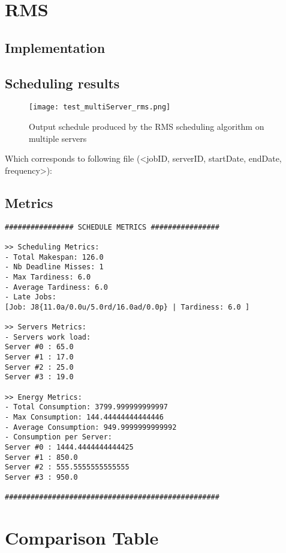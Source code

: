 \documentclass[./report.tex]{subfiles}
\begin{document}
\newpage
\section{RMS}
\subsection{Implementation}

\subsection{Scheduling results}
\begin{figure}[!h]
	\center
	\texttt{[image: test\_multiServer\_rms.png]}
	\caption{Output schedule produced by the RMS scheduling algorithm on multiple servers}
	\label{fig:multiServer_rms} 
\end{figure}

Which corresponds to following file (<jobID, serverID, startDate, endDate, frequency>):


\newpage
\subsection{Metrics}
\begin{lstlisting}[style=txt, caption={Metrics for RMS on multiple servers}]
################ SCHEDULE METRICS ################

>> Scheduling Metrics: 
- Total Makespan: 126.0
- Nb Deadline Misses: 1
- Max Tardiness: 6.0
- Average Tardiness: 6.0
- Late Jobs: 
[Job: J8{11.0a/0.0u/5.0rd/16.0ad/0.0p} | Tardiness: 6.0 ]

>> Servers Metrics: 
- Servers work load:
Server #0 : 65.0
Server #1 : 17.0
Server #2 : 25.0
Server #3 : 19.0

>> Energy Metrics: 
- Total Consumption: 3799.999999999997
- Max Consumption: 144.44444444444446
- Average Consumption: 949.9999999999992
- Consumption per Server: 
Server #0 : 1444.4444444444425
Server #1 : 850.0
Server #2 : 555.5555555555555
Server #3 : 950.0

##################################################
\end{lstlisting}


\newpage
\section{Comparison Table}
\end{document}
